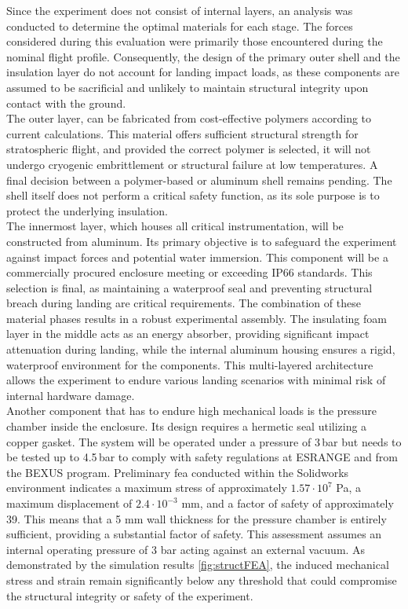 Since the experiment does not consist of internal layers, an analysis was conducted to determine the optimal materials for each stage. The forces considered during this evaluation were primarily those encountered during the nominal flight profile. Consequently, the design of the primary outer shell and the insulation layer do not account for landing impact loads, as these components are assumed to be sacrificial and unlikely to maintain structural integrity upon contact with the ground.\\
The outer layer, can be fabricated from cost-effective polymers according to current calculations. This material offers sufficient structural strength for stratospheric flight, and provided the correct polymer is selected, it will not undergo cryogenic embrittlement or structural failure at low temperatures. A final decision between a polymer-based or aluminum shell remains pending. The shell itself does not perform a critical safety function, as its sole purpose is to protect the underlying insulation.\\
The innermost layer, which houses all critical instrumentation, will be constructed from aluminum. Its primary objective is to safeguard the experiment against impact forces and potential water immersion. This component will be a commercially procured enclosure meeting or exceeding IP66 standards. This selection is final, as maintaining a waterproof seal and preventing structural breach during landing are critical requirements.
The combination of these material phases results in a robust experimental assembly. The insulating foam layer in the middle acts as an energy absorber, providing significant impact attenuation during landing, while the internal aluminum housing ensures a rigid, waterproof environment for the components. This multi-layered architecture allows the experiment to endure various landing scenarios with minimal risk of internal hardware damage. \\
Another component that has to endure high mechanical loads is the pressure chamber inside the enclosure. Its design requires a hermetic seal utilizing a copper gasket. The system will be operated under a pressure of 3\,bar but needs to be tested up to 4.5\,bar to comply with safety regulations at ESRANGE and from the BEXUS program. Preliminary \gls{fea} conducted within the Solidworks environment indicates a maximum stress of approximately $1.57 \cdot 10^7$ Pa, a maximum displacement of $2.4\cdot10^{-3}$ mm, and a factor of safety of approximately 39.
This means that a 5 mm wall thickness for the pressure chamber is entirely sufficient, providing a substantial factor of safety. 
This assessment assumes an internal operating pressure of 3 bar acting against an external vacuum. As demonstrated by the simulation results \autoref{fig:structFEA}, the induced mechanical stress and strain remain significantly below any threshold that could compromise the structural integrity or safety of the experiment.

